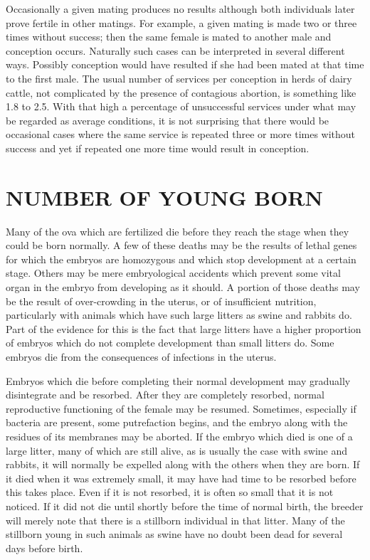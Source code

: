 Occasionally a given mating produces no results although both individuals
later prove fertile in other matings. For example, a given mating
is made two or three times without success; then the same female is
mated to another male and conception occurs. Naturally such cases can
be interpreted in several different ways. Possibly conception would have
resulted if she had been mated at that time to the first male. The usual
number of services per conception in herds of dairy cattle, not complicated
by the presence of contagious abortion, is something like 1.8 to
2.5. With that high a percentage of unsuccessful services under what
may be regarded as average conditions, it is not surprising that there
would be occasional cases where the same service is repeated three or
more times without success and yet if repeated one more time would
result in conception.

\section*{NUMBER OF YOUNG BORN}

Many of the ova which are fertilized die before they reach the stage
when they could be born normally. A few of these deaths may be the
results of lethal genes for which the embryos are homozygous and which
stop development at a certain stage. Others may be mere embryological
accidents which prevent some vital organ in the embryo from developing
as it should. A portion of those deaths may be the result of
over-crowding in the uterus, or of insufficient nutrition, particularly
with animals which have such large litters as swine and rabbits do. Part of
the evidence for this is the fact that large litters have a higher proportion
of embryos which do not complete development than small litters
do. Some embryos die from the consequences of infections in the
uterus.

Embryos which die before completing their normal development
may gradually disintegrate and be resorbed. After they are completely
resorbed, normal reproductive functioning of the female may be
resumed. Sometimes, especially if bacteria are present, some putrefaction
begins, and the embryo along with the residues of its membranes
may be aborted. If the embryo which died is one of a large litter, many
of which are still alive, as is usually the case with swine and rabbits, it
will normally be expelled along with the others when they are born. If
it died when it was extremely small, it may have had time to be resorbed
before this takes place. Even if it is not resorbed, it is often so small that
it is not noticed. If it did not die until shortly before the time of normal
birth, the breeder will merely note that there is a stillborn individual
in that litter. Many of the stillborn young in such animals as swine have
no doubt been dead for several days before birth.

